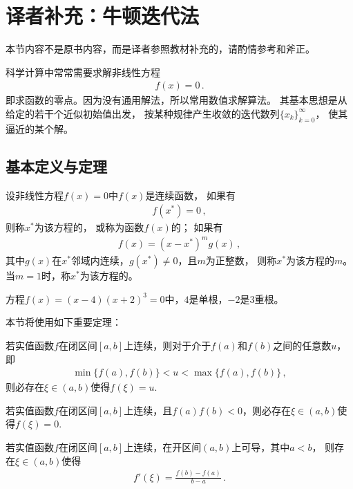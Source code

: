 \section{译者补充：牛顿迭代法}\label{sec:译者补充：牛顿迭代法}
\begin{remark}
    本节内容不是原书内容，而是译者参照教材补充的，请酌情参考和斧正。
\end{remark}

科学计算中常常需要求解非线性方程
\begin{align}\label{eq:02ex0301}
    f(x)=0\, .
\end{align}
即求函数的零点。因为没有通用解法，所以常用数值求解算法。
其基本思想是从给定的若干个近似初始值出发，
按某种规律产生收敛的迭代数列$\{x_k\}_{k=0}^{\infty}$，
使其逼近的某个解。

\subsection{基本定义与定理}\label{sub:基本定义与定理02}
\begin{definition}
    设非线性方程$f(x)=0$中$f(x)$是连续函数，
    如果有
    \begin{align}\label{eq:02ex0302}
        f(x^*)=0\, ,
    \end{align}
    则称$x^*$为该方程的，
    或称为函数$f(x)$的；
    如果有
    \begin{align}\label{eq:02ex0303}
        f(x)=(x-x^*)^mg(x)\, ,
    \end{align}
    其中$g(x)$在$x^*$邻域内连续，$g(x^*)\neq0$，且$m$为正整数，
    则称$x^*$为该方程的$m$。
    当$m=1$时，称$x^*$为该方程的。
\end{definition}

\begin{example}
    方程$f(x)=(x-4)(x+2)^3=0$中，$4$是单根，$-2$是3重根。
\end{example}

本节将使用如下重要定理：
\begin{theorem}
    若实值函数$f$在闭区间$[a,b]$上连续，则对于介于$f(a)$和$f(b)$之间的任意数$u$，即
    \begin{align}\label{eq:02ex0304}
        \min\{f(a),f(b)\}<u<\max\{f(a),f(b)\}\, ,
    \end{align}
    则必存在$\xi\in(a,b)$使得$f(\xi)=u$.
\end{theorem}
\begin{corollary}
    若实值函数$f$在闭区间$[a,b]$上连续，且$f(a)f(b)<0$，则必存在$\xi\in(a,b)$使得$f(\xi)=0$.
\end{corollary}
\begin{theorem}
    若实值函数$f$在闭区间$[a,b]$上连续，在开区间$(a,b)$上可导，其中$a<b$，
    则存在$\xi\in(a,b)$使得
    \begin{align}\label{eq:02ex0305}
        f'(\xi)=\frac{f(b)-f(a)}{b-a}\, .
    \end{align}
\end{theorem}

